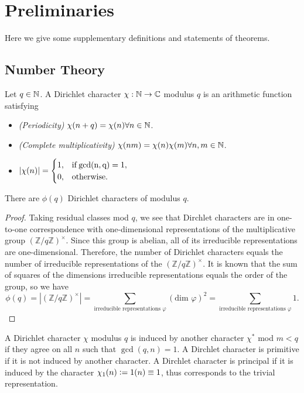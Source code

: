 \section{Preliminaries}
Here we give some supplementary definitions and statements of theorems.
\subsection*{Number Theory}
\begin{definition}
	\label{dcharacter}
	Let $q\in\mathbb{N}$. A Dirichlet character $\chi:\mathbb{N}\to\mathbb{C}$ modulus $q$ is an arithmetic function satisfying \begin{itemize}
		\item \textit{(Periodicity)} $\chi(n+q)=\chi(n)\forall n\in\mathbb{N}$.
		\item \textit{(Complete multiplicativity)} $\chi(nm)=\chi(n)\chi(m)\forall n,m\in\mathbb{N}$.
		\item $|\chi(n)|=\begin{cases}
			1, & \rm{if }\gcd(n,q)=1,\\
			0, & \rm{otherwise.}
		\end{cases}$
	\end{itemize}
\end{definition}
\begin{proposition}
	There are $\phi(q)$ Dirichlet characters of modulus $q$.
\end{proposition}
\begin{proof}
	Taking residual classes mod $q$, we see that Dirchlet characters are in one-to-one correspondence with one-dimensional representations of the multiplicative group $(\mathbb{Z}/q\mathbb{Z})^{\times}$. Since this group is abelian, all of its irreducible representations are one-dimensional. Therefore, the number of Dirichlet characters equals the number of irreducible representations of the $(\mathbb{Z}/q\mathbb{Z})^{\times}$. It is known that the sum of squares of the dimensions irreducible representations equals the order of the group, so we have \[
		\phi(q)=|(\mathbb{Z}/q\mathbb{Z})^{\times}|=\sum_{\textrm{irreducible representations } \varphi}  (\textrm{dim } \varphi)^2 = \sum_{\textrm{irreducible representations } \varphi}  1.
	\]
\end{proof}
\begin{definition}
	A Dirichlet character $\chi$ modulus $q$ is induced by another character $\chi^*$ mod $m<q$ if they agree on all $n$ such that $\gcd(q,n)=1$. A Dirchlet character is primitive if it is not induced by another character. A Dirchlet character is principal if it is induced by the character $\chi_1(n)\mathrel{\mathop:}=1(n)\equiv 1$, thus corresponds to the trivial representation.
\end{definition}
